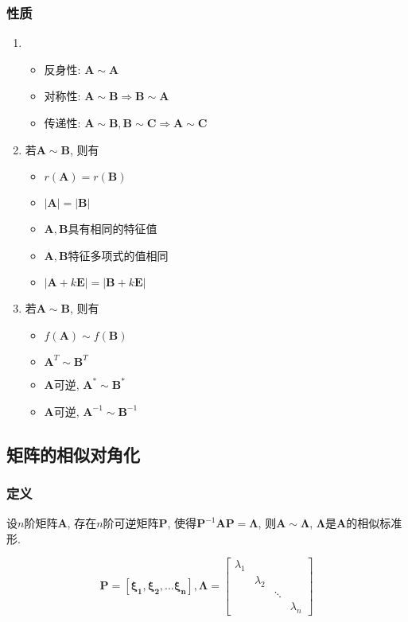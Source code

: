 \subsubsection{性质}
\begin{enumerate}
\item
\begin{itemize}
\item 反身性: $ \bm{A}\sim \bm{A} $
\item 对称性: $ \bm{A}\sim \bm{B}\Rightarrow \bm{B}\sim \bm{A} $
\item 传递性: $ \bm{A}\sim \bm{B}, \bm{B}\sim \bm{C}\Rightarrow \bm{A}\sim \bm{C} $
\end{itemize}
\item 若$ \bm{A}\sim \bm{B} $, 则有
\begin{itemize}
\item $ r(\bm{A})=r(\bm{B}) $
\item $ \left|\bm{A}\right|=\left|\bm{B}\right| $
\item $ \bm{A}, \bm{B} $具有相同的特征值
\item $ \bm{A}, \bm{B} $特征多项式的值相同
\item $ |\bm{A}+k\bm{E}|=|\bm{B}+k\bm{E}| $
\end{itemize}
\item 若$ \bm{A}\sim \bm{B} $, 则有
\begin{itemize}
\item $ f(\bm{A})\sim f(\bm{B}) $
\item $ \bm{A}^{T}\sim \bm{B}^{T} $
\item $ \bm{A} $可逆, $ \bm{A}^{*}\sim \bm{B}^{*} $
\item $ \bm{A} $可逆, $ \bm{A}^{-1}\sim \bm{B}^{-1} $
\end{itemize}
\end{enumerate}
\subsection{矩阵的相似对角化}
\subsubsection{定义}
设$ n $阶矩阵$ \bm{A} $, 存在$ n $阶可逆矩阵$ \bm{P} $, 使得$ \bm{P}^{-1}\bm{A}\bm{P}=\bm{\Lambda} $, 则$ \bm{A}\sim \bm{\Lambda} $, $ \bm{\Lambda} $是$ \bm{A} $的相似标准形.\par
\[ \bm{P}=\left[\bm{\xi_1}, \bm{\xi_2},... \bm{\xi_n}\right], \bm{\Lambda} =
\begin{bmatrix}
\lambda_1 &  &  &  \\
& \lambda_2 &  &  \\
&  & \ddots &  \\
&  &  & \lambda_n
\end{bmatrix}
\]
